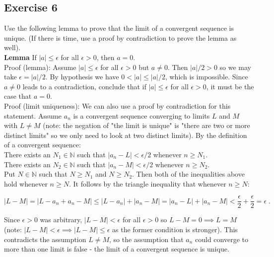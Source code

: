 \documentclass{article}
\begin{document}
\subsection*{Exercise 6}

Use the following lemma to prove that the limit of a convergent sequence is unique. (If there is time, use a proof by contradiction to prove the lemma as well).\\

{\bf Lemma} If $|a| \leq \epsilon$ for all $\epsilon > 0$, then $a = 0$.\\

Proof (lemma): Assume $|a| \leq \epsilon$ for all $\epsilon > 0$ but $a \neq 0$. Then $|a| / 2 > 0$ so we may take $\epsilon = |a| / 2$. By hypothesis we have $0 < |a| \leq |a| / 2$, which is impossible. Since $a \neq 0$ leads to a contradiction, conclude that if $|a| \leq \epsilon$ for all $\epsilon > 0$, it must be the case that $a = 0$. \\

Proof (limit uniqueness): We can also use a proof by contradiction for this statement. Assume $a_n$ is a convergent sequence converging to limits $L$ and $M$ with $L \neq M$ (note: the negation of "the limit is unique" is "there are two or more distinct limits" so we only need to look at two distinct limits). By the definition of a convergent sequence: \\

There exists an $N_1 \in \mathbb{N}$ such that $|a_n - L| < \epsilon /2$ whenever $n \geq N_1$. \\

There exists an $N_2 \in \mathbb{N}$ such that $|a_n - M| < \epsilon /2$ whenever $n \geq N_2$. \\

Put $N \in \mathbb{N}$ such that $N \geq N_1$ and $N \geq N_2$. Then both of the inequalities above hold whenever $n \geq N$. It follows by the triangle inequality that whenever $n \geq N$:

$$
|L - M| = |L - a_n + a_n - M| \leq |L-a_n| + |a_n - M| = |a_n - L| + |a_n - M| < \frac{\epsilon}{2} + \frac{\epsilon}{2} = \epsilon \;.
$$

Since $\epsilon > 0 $ was arbitrary, $|L-M| < \epsilon$ for all $\epsilon > 0$ so $L-M=0 \implies L=M$ (note: $|L-M| < \epsilon \implies |L-M| \leq \epsilon$ as the former condition is stronger). This contradicts the assumption $L \neq M$, so the assumption that $a_n$ could converge to more than one limit is false - the limit of a convergent sequence is unique. 
\end{document}
